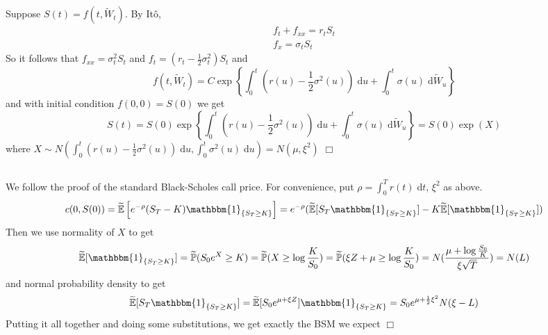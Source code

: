 \documentclass{article}
\begin{document}
\section{}
\subsection{}
Suppose $S(t) = f(t, \widetilde{W}_t)$. By It\^o,
\begin{gather*}
f_t + f_{xx} = r_t S_t\\
f_x = \sigma_t S_t
\end{gather*}
So it follows that $f_{xx} = \sigma^2_t S_t$ and $f_t = (r_t - \frac{1}{2}\sigma^2_t)S_t$ and
$$f(t, \widetilde{W}_t) = C \exp \left\{ \int_0^t \left( r(u) - \frac{1}{2}\sigma^2(u) \right)\;\mathrm{d}u + \int_0^t \sigma(u) \;\mathrm{d}\widetilde{W}_u \right\}$$
and with initial condition $f(0,0) = S(0)$ we get
$$S(t) = S(0)\exp \left\{ \int_0^t \left( r(u) - \frac{1}{2}\sigma^2(u) \right)\;\mathrm{d}u + \int_0^t \sigma(u) \;\mathrm{d}\widetilde{W}_u \right\} = S(0) \exp(X)$$
where $X \sim N(\int_0^t \left( r(u) - \frac{1}{2}\sigma^2(u) \right)\;\mathrm{d}u, \int_0^t \sigma^2(u) \;\mathrm{d}u) = N(\mu, \xi^2)$ $\Box$

\subsection{}
We follow the proof of the standard Black-Scholes call price. For convenience, put $\rho = \int_0^T r(t) \;\mathrm{d}t$, $\xi^2$ as above.
$$c(0,S(0)) = \widetilde{\mathbb{E}}\left[ e^{-\rho} (S_T - K) \mathbbm{1}_{\{S_T \geq K\}} \right] = e^{-\rho}(\widetilde{\mathbb{E}}[S_T\mathbbm{1}_{\{S_T \geq K\}}] - K\widetilde{\mathbb{E}}[\mathbbm{1}_{\{S_T \geq K\}}])$$
Then we use normality of $X$ to get
$$\widetilde{\mathbb{E}}[\mathbbm{1}_{\{S_T \geq K\}}] = \widetilde{\mathbb{P}}(S_0e^X \geq K) = \widetilde{\mathbb{P}}(X \geq \log \frac{K}{S_0}) = \widetilde{\mathbb{P}}(\xi Z + \mu \geq \log \frac{K}{S_0}) = N(\frac{\mu + \log \frac{S_0}{K}}{\xi \sqrt{T}}) = N(L)$$
and normal probability density to get
$$\widetilde{\mathbb{E}}[S_T\mathbbm{1}_{\{S_T \geq K\}}] = \widetilde{\mathbb{E}}[S_0e^{\mu + \xi Z}]\mathbbm{1}_{\{S_T \geq K\}} = S_0 e^{\mu + \frac{1}{2}\xi^2}N(\xi - L)$$
Putting it all together and doing some substitutions, we get exactly the BSM we expect $\Box$

\section{}
\end{document}

